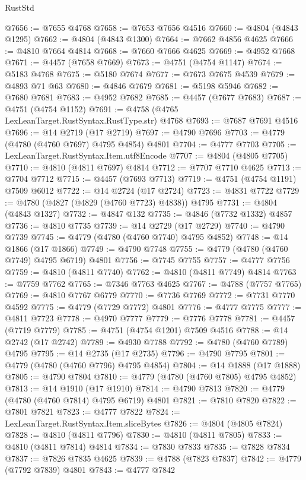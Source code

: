 \begin{lexlean}{RustStd}
\begin{coremodule}
@7656 := @7655 @4768
@7658 := @7653 @7656 @4516
@7660 := @4804 (@4843 @1295)
@7662 := @4804 (@4843 @1300)
@7664 := @7662 @4856 @4625
@7666 := @4810 @7664 @4814
@7668 := @7660 @7666 @4625
@7669 := @4952 @7668
@7671 := @4457 (@7658 @7669)
@7673 := @4751 (@4754 @1147)
@7674 := @5183 @4768
@7675 := @5180 @7674
@7677 := @7673 @7675 @4539
@7679 := @4893 @71 @63
@7680 := @4846 @7679
@7681 := @5198 @5946
@7682 := @7680 @7681
@7683 := @4952 @7682
@7685 := @4457 (@7677 @7683)
@7687 := @4751 (@4754 @1152)
@7691 := @4758 (@4765 LexLeanTarget.RustSyntax.RustType.str) @4768
@7693 := @7687 @7691 @4516
@7696 := @14 @2719 (@17 @2719)
@7697 := @4790 @7696
@7703 := @4779 (@4780 (@4760 @7697) @4795 @4854) @4801
@7704 := @4777 @7703
@7705 := LexLeanTarget.RustSyntax.Item.utf8Encode
@7707 := @4804 (@4805 @7705)
@7710 := @4810 (@4811 @7697) @4814
@7712 := @7707 @7710 @4625
@7713 := @7704 @7712
@7715 := @4457 (@7693 @7713)
@7719 := @4751 (@4754 @1191) @7509 @6012
@7722 := @14 @2724 (@17 @2724)
@7723 := @4831 @7722
@7729 := @4780 (@4827 (@4829 (@4760 @7723) @4838)) @4795
@7731 := @4804 (@4843 @1327)
@7732 := @4847 @132
@7735 := @4846 (@7732 @1332) @4857
@7736 := @4810 @7735
@7739 := @14 @2729 (@17 @2729)
@7740 := @4790 @7739
@7745 := @4779 (@4780 (@4760 @7740) @4795 @4852)
@7748 := @14 @1866 (@17 @1866)
@7749 := @4790 @7748
@7755 := @4779 (@4780 (@4760 @7749) @4795 @6719) @4801
@7756 := @7745 @7755
@7757 := @4777 @7756
@7759 := @4810 (@4811 @7740)
@7762 := @4810 (@4811 @7749) @4814
@7763 := @7759 @7762
@7765 := @7346 @7763 @4625
@7767 := @4788 (@7757 @7765)
@7769 := @4810 @7767 @6779
@7770 := @7736 @7769
@7772 := @7731 @7770 @4592
@7775 := @4779 (@7729 @7772) @4801
@7776 := @4777 @7775
@7777 := @4811 @7723
@7778 := @4970 @7777
@7779 := @7776 @7778
@7781 := @4457 (@7719 @7779)
@7785 := @4751 (@4754 @1201) @7509 @4516
@7788 := @14 @2742 (@17 @2742)
@7789 := @4930 @7788
@7792 := @4780 (@4760 @7789) @4795
@7795 := @14 @2735 (@17 @2735)
@7796 := @4790 @7795
@7801 := @4779 (@4780 (@4760 @7796) @4795 @4854)
@7804 := @14 @1888 (@17 @1888)
@7805 := @4790 @7804
@7810 := @4779 (@4780 (@4760 @7805) @4795 @4852)
@7813 := @14 @1910 (@17 @1910)
@7814 := @4790 @7813
@7820 := @4779 (@4780 (@4760 @7814) @4795 @6719) @4801
@7821 := @7810 @7820
@7822 := @7801 @7821
@7823 := @4777 @7822
@7824 := LexLeanTarget.RustSyntax.Item.sliceBytes
@7826 := @4804 (@4805 @7824)
@7828 := @4810 (@4811 @7796)
@7830 := @4810 (@4811 @7805)
@7833 := @4810 (@4811 @7814) @4814
@7834 := @7830 @7833
@7835 := @7828 @7834
@7837 := @7826 @7835 @4625
@7839 := @4788 (@7823 @7837)
@7842 := @4779 (@7792 @7839) @4801
@7843 := @4777 @7842

\end{coremodule}
\end{lexlean}
